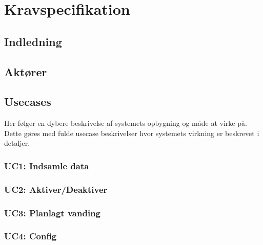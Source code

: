 \chapter{Kravspecifikation}

\clearpage


\section{Indledning}



\section{Aktører}



\section{Usecases}

Her følger en dybere beskrivelse af systemets opbygning og måde at virke på. Dette gøres med fulde usecase beskrivelser hvor systemets virkning er beskrevet i detaljer.


\subsection{UC1: Indsamle data}



\subsection{UC2: Aktiver/Deaktiver}



\subsection{UC3: Planlagt vanding}



\subsection{UC4: Config}


